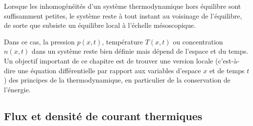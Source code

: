 \documentclass[12pt,fancy]{cours}
\begin{document}
\begin{prop}
Lorsque les inhomogénéités d’un système thermodynamique hors équilibre sont suffisamment petites, le système reste à tout instant au voisinage de l'équilibre, de sorte que subsiste un équilibre local à l'échelle mésoscopique.
\end{prop}
\noindent Dans ce cas, la pression $p(x,t)$, température $T(x,t)$ ou concentration $n(x,t)$ dans un système reste bien définie mais dépend de l’espace et du temps. Un objectif important de ce chapitre est de trouver une version locale (c’est-à-dire une équation différentielle par rapport aux variables d’espace $x$ et de temps $t$) des principes de la thermodynamique, en particulier de la conservation de l’énergie.

\subsection{Flux et densité de courant thermiques}
\end{document}
